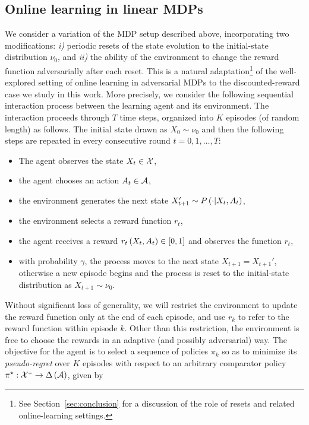 \subsection{Online learning in linear MDPs}

We consider a variation of the MDP setup described above, incorporating two modifications: \emph{i)} periodic resets of the state evolution to the initial-state distribution $\nu_0$, and \emph{ii)} the ability of the environment to change the reward function adversarially after each reset. This is a natural adaptation\footnote{See Section~\ref{sec:conclusion} for a discussion of the role of resets and related online-learning settings.} of the well-explored setting of online learning in adversarial MDPs to the discounted-reward case we study in this work. More precisely, we consider the following sequential interaction process between the learning agent and its environment. The interaction proceeds through $T$ time steps, organized into $K$ episodes (of random length) as follows. The initial state drawn as $X_0 \sim \nu_0$ and then the following steps are repeated in every consecutive round $t = 0, 1, \dots, T$: 
%
\begin{itemize}
 \item The agent observes the state $X_t \in \mathcal{X}$, 
 \item the agent chooses an action $A_t \in \mathcal{A}$,
 \item the environment generates the next state $X_{t+1}' \sim P \left( \cdot \middle| X_t, A_t \right)$,
 \item the environment selects a reward function $r_t$,
 \item the agent receives a reward $r_t \left( X_t, A_t \right) \in \left[ 0, 1 \right]$ and observes the function $r_t$,
 \item with probability $\gamma$, the process moves to the next state $X_{t+1} = X_{t+1}'$, otherwise a new episode begins and the process is reset to the initial-state distribution as $X_{t+1}\sim \nu_0$.
\end{itemize}
%
Without significant loss of generality, we will restrict the environment to update the reward function only at the end of each episode, and use $r_k$ to refer to the reward function within episode $k$. Other than this restriction, the environment is free to choose the rewards in an adaptive (and possibly adversarial) way. The objective for the agent is to select a sequence of policies $\pi_k$ so as to minimize its \emph{pseudo-regret} over $K$ episodes with respect to an arbitrary comparator policy $\pi^\star: \mathcal{X}^{\mathsf{\scriptscriptstyle +}} \rightarrow \Delta \left( \mathcal{A} \right)$, given by 
